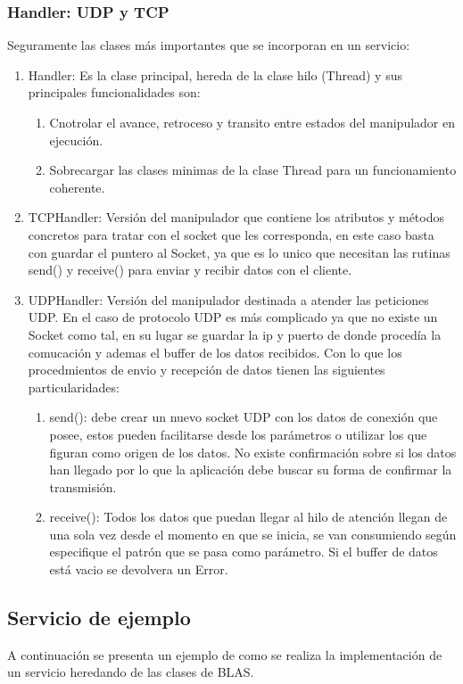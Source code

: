 \documentclass[a4paper,spanish,12pt]{book}
\begin{document}
\subsubsection{Handler: UDP y TCP}
Seguramente las clases más importantes que se incorporan en un servicio:
\begin{enumerate}
	\item Handler: Es la clase principal, hereda de la clase hilo (Thread) y sus principales funcionalidades son:
		\begin{enumerate}
			\item Cnotrolar el avance, retroceso y transito entre estados del manipulador en ejecución.
			\item Sobrecargar las clases minimas de la clase Thread para un funcionamiento coherente.
		\end{enumerate}
	\item TCPHandler: Versión del manipulador que contiene los atributos y m\'etodos concretos para tratar con el socket que les corresponda, en este caso basta con guardar el puntero al Socket, ya que es lo unico que necesitan las rutinas send() y receive() para enviar y recibir datos con el cliente.
	\item UDPHandler: Versión del manipulador destinada a atender las peticiones UDP. En el caso de protocolo UDP es más complicado ya que no existe un Socket como tal, en su lugar se guardar la ip y puerto de donde procedía la comucación y ademas el buffer de los datos recibidos. Con lo que los procedmientos de envio y recepción de datos tienen las siguientes particularidades:
		\begin{enumerate}
			\item send(): debe crear un nuevo socket UDP con los datos de conexión que posee, estos pueden facilitarse desde los parámetros o utilizar los que figuran como origen de los datos. No existe confirmación sobre si los datos han llegado por lo que la aplicación debe buscar su forma de confirmar la transmisión.
			\item receive(): Todos los datos que puedan llegar al hilo de atención llegan de una sola vez desde el momento en que se inicia, se van consumiendo según especifique el patrón que se pasa como parámetro. Si el buffer de datos está vacio se devolvera un Error.
		\end{enumerate}
\end{enumerate}
\subsection{Servicio de ejemplo}
A continuación se presenta un ejemplo de como se realiza la implementación de un servicio heredando de las clases de BLAS.
\end{document}
